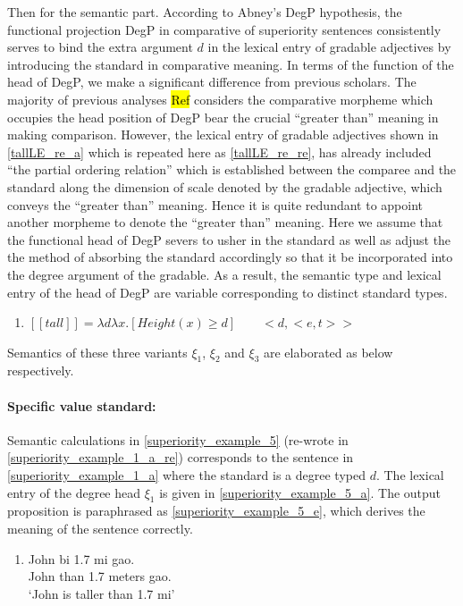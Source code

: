 \documentclass{ctexart}
\begin{document}
Then for the semantic part. According to Abney's DegP hypothesis, the functional projection DegP in comparative of superiority sentences consistently serves to bind the extra argument $d$ in the lexical entry of gradable adjectives by introducing the standard in comparative meaning. In terms of the function of the head of DegP, we make a significant  difference from previous scholars. The majority of previous analyses \hl{Ref} considers the comparative morpheme which occupies the head position of DegP bear the crucial ``greater than'' meaning in making comparison. However, the lexical entry of gradable adjectives shown in \ref{tallLE_re_a} which is repeated here as \ref{tallLE_re_re}, has already included ``the partial ordering relation'' which is established between the comparee and the standard along the dimension of scale denoted by the gradable adjective, which conveys the ``greater than'' meaning. Hence it is quite redundant to appoint another morpheme to denote the ``greater than'' meaning.  Here we assume that the functional head of DegP severs to usher in the standard as well as adjust the the method of absorbing the standard accordingly so that it be incorporated into the degree argument of the gradable. As a result, the semantic type and lexical entry of the head of DegP are variable corresponding to distinct standard types.

\begin{enumerate}
    \item \label{tallLE_re_re}
    $[\![tall]\!]=\lambda d \lambda x.[Height(x) \geq d] \qquad <d,<e,t>>$
\end{enumerate}

Semantics of these three variants $\xi_1$, $\xi_2$ and $\xi_3$ are elaborated as below respectively.

\paragraph{Specific value standard:}

Semantic calculations in \ref{superiority_example_5} (re-wrote in \ref{superiority_example_1_a_re}) corresponds to the sentence in \ref{superiority_example_1_a} where the standard is a degree typed $d$. The lexical entry of the degree head $\xi_1$ is given in \ref{superiority_example_5_a}. The output proposition is paraphrased as \ref{superiority_example_5_e}, which derives the meaning of the sentence correctly.

\begin{enumerate}
    \item \label{superiority_example_1_a_re}
    John bi 1.7 mi gao. \\
    John than 1.7 meters gao. \\
    `John is taller than 1.7 mi' 
\end{enumerate}
\end{document}
